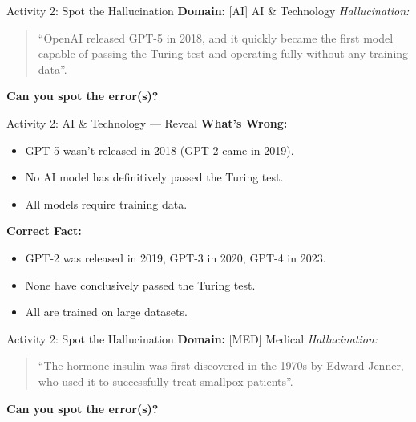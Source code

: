 \documentclass{beamer}
\begin{document}
\begin{frame}{Activity 2: Spot the Hallucination}
    	\textbf{Domain:} [AI] AI \& Technology
    \vspace{0.3cm}
    	\textit{Hallucination:}
    \begin{quote}
        ``OpenAI released GPT-5 in 2018, and it quickly became the first model capable of passing the Turing test and operating fully without any training data''.
    \end{quote}
    \vspace{0.3cm}
    	\textbf{Can you spot the error(s)?}
\end{frame}

\begin{frame}{Activity 2: AI \& Technology — Reveal}
    	\textbf{What’s Wrong:}
    \begin{itemize}
        \item GPT-5 wasn’t released in 2018 (GPT-2 came in 2019).
        \item No AI model has definitively passed the Turing test.
        \item All models require training data.
    \end{itemize}
    	\textbf{Correct Fact:}
    \begin{itemize}
        \item GPT-2 was released in 2019, GPT-3 in 2020, GPT-4 in 2023.
        \item None have conclusively passed the Turing test.
        \item All are trained on large datasets.
    \end{itemize}
\end{frame}

\begin{frame}{Activity 2: Spot the Hallucination}
    	\textbf{Domain:} [MED] Medical
    \vspace{0.3cm}
    	\textit{Hallucination:}
    \begin{quote}
        ``The hormone insulin was first discovered in the 1970s by Edward Jenner, who used it to successfully treat smallpox patients''.
    \end{quote}
    \vspace{0.3cm}
    	\textbf{Can you spot the error(s)?}
\end{frame}
\end{document}
